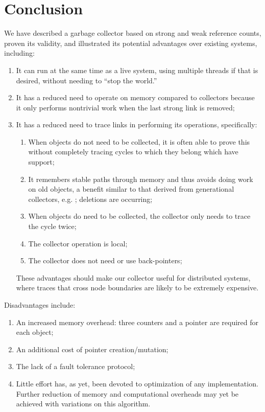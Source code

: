 \section{Conclusion}
\label{section:conclusion}
We have described a garbage collector based on strong and weak reference counts,
proven its validity,
and illustrated its potential advantages over existing systems, including:
\begin{enumerate}
\item It can run at the same time as a live system, using multiple threads if that
is desired, without needing to ``stop the world.''
\item It has a reduced need to operate on memory compared to collectors because
it only performs nontrivial work when the last strong link is removed;
\item It has a reduced need to trace links in performing its operations, specifically:
\begin{enumerate}
\item When objects do not need to be collected, it is often able to prove this
without completely tracing cycles to which they belong which have support;
\item It remembers stable paths through memory and thus avoids doing work on old objects,
a benefit similar to that derived from generational collectors, e.g. \cite{Printezis:2000};
deletions are occurring;
\item When objects do need to be collected, the collector only needs to trace the cycle twice;
\item The collector operation is local;
\item The collector does not need or use back-pointers;
\end{enumerate}
These advantages should make our collector useful for distributed systems, where traces that
cross node boundaries are likely to be extremely expensive.
\end{enumerate}
\vspace{0.5in}
Disadvantages include:
\begin{enumerate}
\item An increased memory overhead: three counters and a pointer are required
for each object;
\item An additional cost of pointer creation/mutation;
\item The lack of a fault tolerance protocol;
\item Little effort has, as yet, been devoted to optimization of any implementation. Further reduction of memory and computational overheads may yet be achieved with variations on this algorithm.
\end{enumerate}

